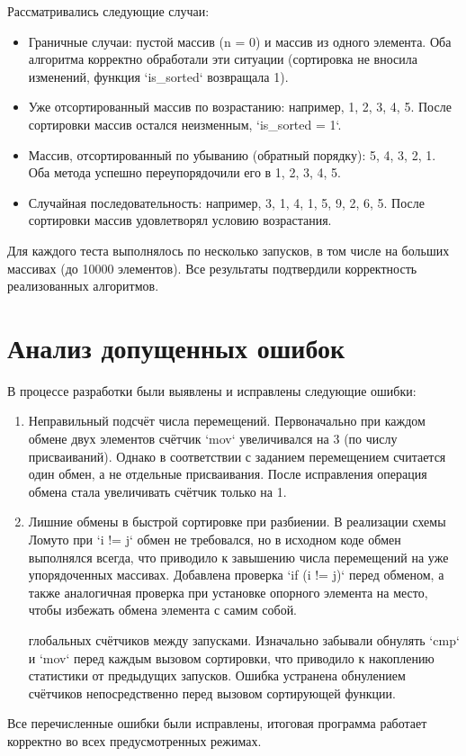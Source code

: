 \documentclass[a4paper,12pt,titlepage,finall]{article}
\begin{document}
\begin{itemize}
\begin{itemize}
Рассматривались следующие случаи:
\begin{itemize}
\item Граничные случаи: пустой массив (n = 0) и массив из одного элемента. Оба алгоритма корректно обработали эти ситуации (сортировка не вносила изменений, функция `is_sorted` возвращала 1).
\item Уже отсортированный массив по возрастанию: например, {1, 2, 3, 4, 5}. После сортировки массив остался неизменным, `is_sorted = 1`.
\item Массив, отсортированный по убыванию (обратный порядку): {5, 4, 3, 2, 1}. Оба метода успешно переупорядочили его в {1, 2, 3, 4, 5}.
\item Случайная последовательность: например, {3, 1, 4, 1, 5, 9, 2, 6, 5}. После сортировки массив удовлетворял условию возрастания.
\end{itemize}
Для каждого теста выполнялось по несколько запусков, в том числе на больших массивах (до 10000 элементов). Все результаты подтвердили корректность реализованных алгоритмов.

\newpage

\section{Анализ допущенных ошибок}

В процессе разработки были выявлены и исправлены следующие ошибки:
\begin{enumerate}
\item Неправильный подсчёт числа перемещений. Первоначально при каждом обмене двух элементов счётчик `mov` увеличивался на 3 (по числу присваиваний). Однако в соответствии с заданием перемещением считается один обмен, а не отдельные присваивания. После исправления операция обмена стала увеличивать счётчик только на 1.

\item Лишние обмены в быстрой сортировке при разбиении. В реализации схемы Ломуто при `i != j` обмен не требовался, но в исходном коде обмен выполнялся всегда, что приводило к завышению числа перемещений на уже упорядоченных массивах. Добавлена проверка `if (i != j)` перед обменом, а также аналогичная проверка при установке опорного элемента на место, чтобы избежать обмена элемента с самим собой.

 глобальных счётчиков между запусками. Изначально забывали обнулять `cmp` и `mov` перед каждым вызовом сортировки, что приводило к накоплению статистики от предыдущих запусков. Ошибка устранена обнулением счётчиков непосредственно перед вызовом сортирующей функции.
\end{enumerate}
Все перечисленные ошибки были исправлены, итоговая программа работает корректно во всех предусмотренных режимах.


\end{itemize}
\end{itemize}
\end{document}
